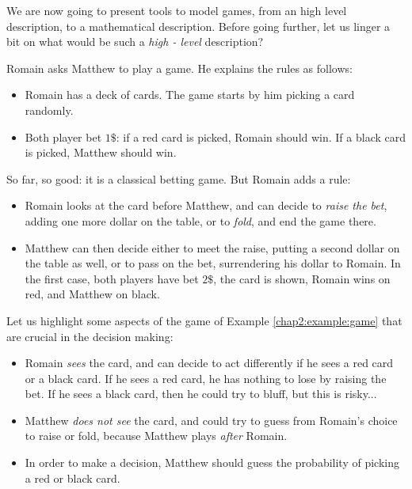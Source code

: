 We are now going to present tools to model games, from an high level description, to a mathematical description. Before going further, let us linger a bit on what would be such a \emph{high - level} description?
\begin{example}
\label{chap2:example:game}
Romain asks Matthew to play a game. He explains the rules as follows:
\begin{itemize}
\item Romain has a deck of cards. The game starts by him picking a card randomly.
\item Both player bet $1\$$: if a red card is picked, Romain should win. If a black card is picked, Matthew should win.
\end{itemize} 
So far, so good: it is a classical betting game. But Romain adds a rule:
\begin{itemize}
\item Romain looks at the card before Matthew, and can decide to \emph{raise the bet}, adding one more dollar on the table, or to \emph{fold}, and end the game there.
 \item Matthew can then decide either to 
 meet the raise, 
 putting a second dollar on the table as well, 
or to pass on the bet, surrendering his dollar to Romain. 
In the first case, both players have bet $2\$$, 
the card is shown, Romain wins on red, and Matthew on black.
\end{itemize}

Let us highlight some aspects of the game of Example \ref{chap2:example:game} that are crucial in the decision making:
\begin{itemize}
\item Romain \emph{sees} the card, and can decide to act differently if he sees a red card or a black card. If he sees a red card, he has nothing to lose by raising the bet. If he sees a black card, then he could try to bluff, but this is risky...
\item Matthew \emph{does not see} the card, and could try to guess from Romain's choice to raise or fold, because Matthew plays \emph{after} Romain. 
\item In order to make a decision, Matthew should guess the probability of picking a red or black card. 
\end{itemize}
\end{example}


